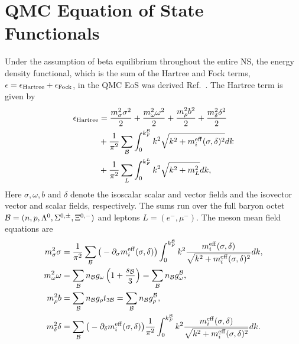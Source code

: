\chapter{QMC Equation of State Functionals}
\label{appendix:QMC_details}

Under the assumption of beta equilibrium throughout the entire NS, the energy density functional, which is the sum of the Hartree and Fock terms, $\epsilon = \epsilon_{\rm Hartree} + \epsilon_\mathrm{Fock}$, in the QMC EoS was derived Ref.~\cite{Motta:2019tjc_Isovectoreffectsneutron}. The Hartree term is given by
%
\begin{equation}
	\begin{split}
		\epsilon_{\rm Hartree} & = \frac{m_\sigma^2\sigma^2}{2} + \frac{m_\omega^2\omega^2}{2}+ \frac{m_\rho^2b^2}{2} + \frac{m_\delta^2\delta^2}{2}\\
		&+ \frac{1}{\pi^2}\sum_{\cal B}\int_{0}^{k_F^{\cal B}}{k^2}{\sqrt{k^2+m_i^{\rm eff}(\sigma,\delta)^2}dk}   \\
		& + \frac{1}{\pi^2}\sum_L \int_{0}^{k_F^L}{k^2}{\sqrt{k^2+m_L^2}dk},
	\end{split}
\end{equation}
%
Here $\sigma, \omega, b$ and $\delta$ denote the isoscalar scalar and vector fields and the isovector vector and scalar fields, respectively. The sums run over the full baryon octet ${\cal B}=(n, p, \Lambda^0, \Sigma^{0,\pm},  \Xi^{0,-})$ and leptons 
$L=(e^-, \mu^-)$. 
The meson mean field equations are
%
\begin{align}
\label{eq:mean-field}
	m_\sigma^2\sigma  & = \frac{1}{\pi^2} \sum_{\cal B} \big(-\partial_\sigma 
	m_i^{\rm eff}(\sigma,\delta)\big)
	 \int_0^{k_F^{\cal B}} k^2 
	\frac{m_i^{\rm eff}(\sigma,{\delta})}{\sqrt{k^2 + m_i^{\rm eff}(\sigma,{\delta})^2}}dk,  \\
	m_\omega^2 \omega  & = \sum_{\cal B} n_{\cal B} g_\omega  \left( 1+\frac{s_{\cal B}}{3} \right) =
	\sum_{\cal B}  n_{\cal B} g_\omega^{\cal B} , \\
	m_\rho^2 b & = \sum_{\cal B}  n_{\cal B} g_\rho t_{3\cal B} =\sum_{\cal B}  n_{\cal B} g_\rho^{\cal B} , \label{eq:meanrho} \\
	m_\delta^2{\delta}  & =  \sum_{\cal B} \big(-\partial_\delta m_i^{\rm eff}(\sigma,\delta)\big)
	\frac{1}{\pi^2}\int_0^{k_F^{\cal B}} k^2 
	\frac{m_i^{\rm eff}(\sigma,{\delta})}{\sqrt{k^2 + m_i^{\rm eff}(\sigma,{\delta})^2}}dk.
\end{align}
